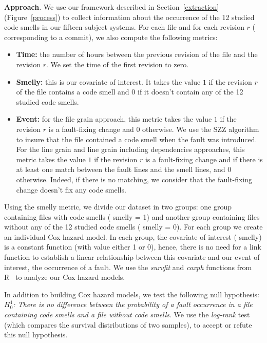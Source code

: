 \textbf{Approach}. We use our framework described in Section~\ref{extraction} {\color{blue}(Figure~\ref{process})} to collect information about the occurrence of the 12 studied code smells in our {\color{blue}fifteen} subject systems. %
For each file and for each revision $r$ (\ie{} corresponding to a commit), we also compute the following metrics:
\begin{itemize}
\item \textbf{Time:} the number of hours between the previous revision of the file and the revision $r$. 
We set the time of the first revision to zero.
\item \textbf{Smelly:} this is our covariate of interest. It takes the value $1$ if the revision $r$ of the file contains a code smell and $0$ if it doesn't contain any of the 12 studied code smells. 
\item \textbf{Event:} {\color{blue}for the file grain approach,} this metric takes the value $1$ if the revision $r$ is a fault-fixing change and $0$ otherwise. We use the SZZ algorithm to insure that the file contained a code smell when the fault was introduced. {\color{blue}For the line grain and line grain including dependencies approaches, this metric takes the value $1$ if the revision $r$ is a fault-fixing change and if there is at least one match between the fault lines and the smell lines, and $0$ otherwise. Indeed, if there is no matching, we consider that the fault-fixing change doesn't fix any code smells.}
\end{itemize}

Using the smelly metric, we divide our dataset in two groups: one group containing files with code smells (\ie{} smelly = 1) and another group containing files without any of the 12 studied code smells (\ie{} smelly = 0). For each group we create an individual Cox hazard model. In each group, the covariate of interest (\ie{} smelly) is a constant function (with value either 1 or 0), hence, there is no need for a link function to establish a linear relationship between this covariate and our event of interest, \ie{} the occurrence of a fault. We use the \textsl{survfit} and \textsl{coxph} functions from R~\cite{rPackage} to analyze our Cox hazard models.

In addition to building Cox hazard models, we test the following null hypothesis: \emph{$H^{1}_{0}$: There is no difference between the probability of a fault occurrence in a file containing code smells and a file without code smells}. We use the \textsl{log-rank} test (which compares the survival distributions of two samples), to accept or refute this null hypothesis.

